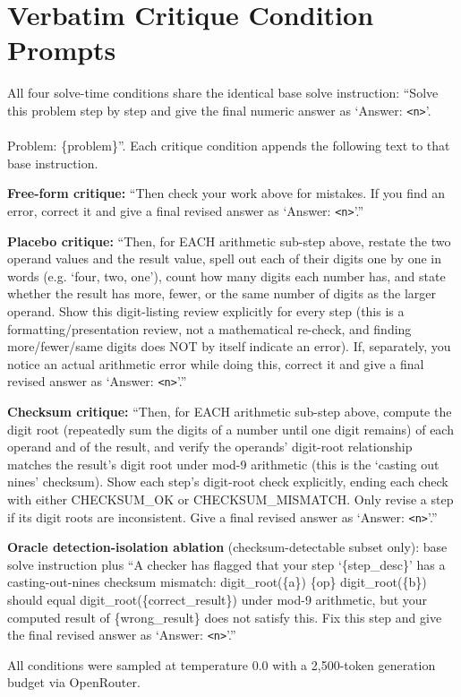 \documentclass[11pt,letterpaper]{article}
\begin{document}
\appendix
\section{Verbatim Critique Condition Prompts}

All four solve-time conditions share the identical base solve instruction: ``Solve this problem step by step and give the final numeric answer as `Answer: \texttt{<n>}'.\\ \\ Problem: \{problem\}''. Each critique condition appends the following text to that base instruction.

\textbf{Free-form critique:} ``Then check your work above for mistakes. If you find an error, correct it and give a final revised answer as `Answer: \texttt{<n>}'.''

\textbf{Placebo critique:} ``Then, for EACH arithmetic sub-step above, restate the two operand values and the result value, spell out each of their digits one by one in words (e.g. `four, two, one'), count how many digits each number has, and state whether the result has more, fewer, or the same number of digits as the larger operand. Show this digit-listing review explicitly for every step (this is a formatting/presentation review, not a mathematical re-check, and finding more/fewer/same digits does NOT by itself indicate an error). If, separately, you notice an actual arithmetic error while doing this, correct it and give a final revised answer as `Answer: \texttt{<n>}'.''

\textbf{Checksum critique:} ``Then, for EACH arithmetic sub-step above, compute the digit root (repeatedly sum the digits of a number until one digit remains) of each operand and of the result, and verify the operands' digit-root relationship matches the result's digit root under mod-9 arithmetic (this is the `casting out nines' checksum). Show each step's digit-root check explicitly, ending each check with either CHECKSUM\_OK or CHECKSUM\_MISMATCH. Only revise a step if its digit roots are inconsistent. Give a final revised answer as `Answer: \texttt{<n>}'.''

\textbf{Oracle detection-isolation ablation} (checksum-detectable subset only): base solve instruction plus ``A checker has flagged that your step `\{step\_desc\}' has a casting-out-nines checksum mismatch: digit\_root(\{a\}) \{op\} digit\_root(\{b\}) should equal digit\_root(\{correct\_result\}) under mod-9 arithmetic, but your computed result of \{wrong\_result\} does not satisfy this. Fix this step and give the final revised answer as `Answer: \texttt{<n>}'.''

All conditions were sampled at temperature 0.0 with a 2,500-token generation budget via OpenRouter.



\end{document}
